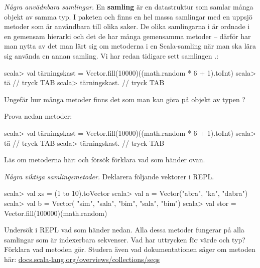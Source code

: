 \Task \emph{Några anvädnbara samlingar.} En \textbf{samling}  är en datastruktur som samlar många objekt av samma typ. I paketen  och  finns en hel massa samlingar med en uppsjö metoder som är användbara till olika saker. De olika samlingarna i  är ordnade i en gemensam hierarki och det de har många gemensamma metoder -- därför har man nytta av det man lärt sig om metoderna i en Scala-samling när man ska lära sig använda en annan samling. Vi har redan tidigare sett samlingen .:

\begin{REPL}
scala> val tärningskast = Vector.fill(10000)((math.random * 6 + 1).toInt)
scala> tä   // tryck TAB
scala> tärningskast.  // tryck TAB
\end{REPL}

\Subtask Ungefär hur många metoder finns det som man kan göra på objekt av typen ?

\Subtask Prova nedan metoder:
\begin{REPL}
scala> val tärningskast = Vector.fill(10000)((math.random * 6 + 1).toInt)
scala> tä   // tryck TAB
scala> tärningskast.  // tryck TAB
\end{REPL}


\Subtask Läs om metoderna här: och försök förklara vad som händer ovan.

\Task \emph{Några viktiga samlingsmetoder.} Deklarera följande vektorer i REPL. 
\begin{REPL}
scala> val xs = (1 to 10).toVector
scala> val a = Vector("abra", "ka", "dabra")
scala> val b = Vector( "sim", "sala", "bim", "sala", "bim")
scala> val stor = Vector.fill(100000)(math.random)
\end{REPL}
Undersök i REPL vad som händer nedan. Alla dessa metoder fungerar på alla samlingar som är indexerbara sekvenser. Vad har uttrycken för värde och typ? Förklara vad metoden gör. Studera även vad dokumentationen säger om metoden här: \href{http://docs.scala-lang.org/overviews/collections/seqs}{docs.scala-lang.org/overviews/collections/seqs}

\Subtask {}

\Subtask {}

\Subtask {}

\Subtask {}

\Subtask {}

\Subtask {}

